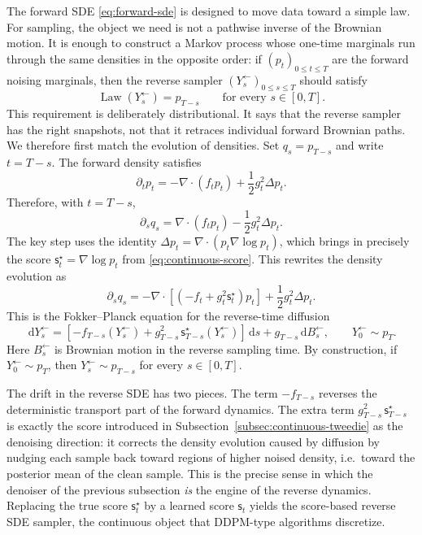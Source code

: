 \documentclass{amsart}
\numberwithin{equation}{section}
\theoremstyle{plain}
\theoremstyle{definition}
\theoremstyle{remark}
\DeclareMathOperator{\Law}{Law}
\newcommand{\dd}{\,\mathrm{d}}
\newcommand{\sstar}{\mathsf{s}^{\star}}
\newcommand{\score}{\mathsf{s}}
\begin{document}
The forward SDE \eqref{eq:forward-sde} is designed to move data toward a simple
law.  For sampling, the object we need is not a pathwise inverse of the
Brownian motion.  It is enough to construct a Markov process whose one-time
marginals run through the same densities in the opposite order: if
$(p_t)_{0\leq t\leq T}$ are the forward noising marginals, then the reverse
sampler $(Y^{\leftarrow}_s)_{0\leq s\leq T}$ should satisfy
\[
    \Law(Y^{\leftarrow}_s)=p_{T-s}
    \qquad\text{for every }s\in[0,T].
\]
This requirement is deliberately distributional.  It says that the reverse
sampler has the right snapshots, not that it retraces individual forward
Brownian paths.  We therefore first match the evolution of densities.
Set $q_s=p_{T-s}$ and write $t=T-s$.  The forward density satisfies
\[
    \partial_t p_t
    =
    -\nabla\cdot(f_tp_t)
    +\frac12g_t^2\Delta p_t.
\]
Therefore, with $t=T-s$,
\[
    \partial_s q_s
    =
    \nabla\cdot(f_t p_t)
    -\frac12g_t^2\Delta p_t.
\]
The key step uses the identity $\Delta p_t=\nabla\cdot(p_t\nabla\log p_t)$,
which brings in precisely the score $\sstar_t=\nabla\log p_t$ from
\eqref{eq:continuous-score}.  This rewrites the density evolution as
\[
    \partial_s q_s
    =
    -\nabla\cdot\left[
    \left(-f_t+g_t^2\sstar_t\right)p_t
    \right]
    +\frac12g_t^2\Delta p_t.
\]
This is the Fokker--Planck equation for the reverse-time diffusion
\begin{equation}\label{eq:reverse-sde}
    \dd Y^{\leftarrow}_s
    =
    \left[-f_{T-s}(Y^{\leftarrow}_s)
    +g_{T-s}^2\,\sstar_{T-s}(Y^{\leftarrow}_s)\right]\dd s
    +g_{T-s}\dd B^{\leftarrow}_s,
    \qquad Y^{\leftarrow}_0\sim p_T.
\end{equation}
Here $B^{\leftarrow}_s$ is Brownian motion in the reverse sampling time.  By
construction, if $Y^{\leftarrow}_0\sim p_T$, then $Y^{\leftarrow}_s\sim p_{T-s}$ for every $s\in[0,T]$.

The drift in the reverse SDE has two pieces.  The term $-f_{T-s}$ reverses the
deterministic transport part of the forward dynamics.  The extra term
$g_{T-s}^2\,\sstar_{T-s}$ is exactly the score introduced in
Subsection~\ref{subsec:continuous-tweedie} as the denoising direction: it corrects the density
evolution caused by diffusion by nudging each sample back toward regions of
higher noised density, i.e.\ toward the posterior mean of the clean sample.
This is the precise sense in which the denoiser of the previous subsection
\emph{is} the engine of the reverse dynamics.  Replacing the true score
$\sstar_t$ by a learned score $\score_t$ yields the score-based reverse SDE
sampler, the continuous object that DDPM-type algorithms discretize.
\end{document}
